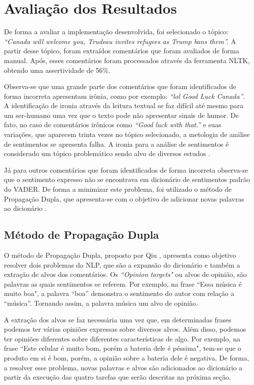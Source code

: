 \chapter{Avaliação dos Resultados}
\label{cap:impl}
De forma a avaliar a implementação desenvolvida, foi selecionado o tópico:
\textit{``Canada will welcome you, Trudeau invites refugees as Trump bans
them''.}
A partir desse tópico, foram extraídos comentários que foram avaliados de
forma manual. Após, esses comentários foram processados através da ferramenta
\ac{NLTK}, obtendo uma assertividade de 56\%.

Observa-se que uma grande parte dos comentários que foram identificados de forma
incorreta apresentam irônia, como por exemplo: \textit{``lol Good Luck
Canada''}. A identificação de ironia através da leitura textual se
faz difícil até mesmo para um ser-humano uma vez que o texto pode
não apresentar sinais de humor. De fato, no caso de comentários
irônicos como \textit{``Good luck with that.''} e suas variações, que aparecem
trinta vezes no tópico selecionado, a metologia de análise de sentimentos se
apresenta falha. A ironia para a análise de sentimentos é considerado
um tópico problemático sendo alvo de diversos estudos \cite{DBLP:conf/lrec/StranisciBFP16}.

Já para outros comentários que foram identificados de forma incorreta
observa-se que o sentimento expresso não se encontrava em dicionário de
sentimentos padrão do \ac{VADER}. De forma a minimizar este problema, foi
utilizado o método de Propagação Dupla, que apresenta-se com o objetivo de
adicionar novas palavras ao dicionário \cite{Qiu:2011:OWE:1970420.1970422}.

\section{Método de Propagação Dupla}

O método de Propagação Dupla, proposto por Qiu
\cite{Qiu:2011:OWE:1970420.1970422}, apresenta como objetivo resolver dois
problemas do \ac{NLP}, que são a expansão do dicionário e também a extração de
alvos dos comentários. Os \textit{``Opinion targets"} ou alvos de opinião, são
palavras as quais sentimentos se referem. Por exemplo, na frase ``Essa
música é muito boa", a palavra ``boa'' demonstra o sentimento do autor com relação a
``música''. Tornando assim, a palavra música um alvo de opinião. 

A extração dos alvos se faz necessária uma vez que, em determinadas frases
podemos ter várias opiniões expressas sobre diversos alvos. Além disso, podemos
ter opiniões diferentes sobre diferentes características de algo. Por exemplo, na frase ``Este celular é muito bom, porém a bateria dele é péssima", tem-se que o
produto em si é bom, porém, a opinião sobre a bateria dele é negativa. De
forma, a resolver esse problema, novas palavras e alvos são adicionados ao
dicionário a partir da execução das quatro tarefas que serão descritas na
próxima seção.

